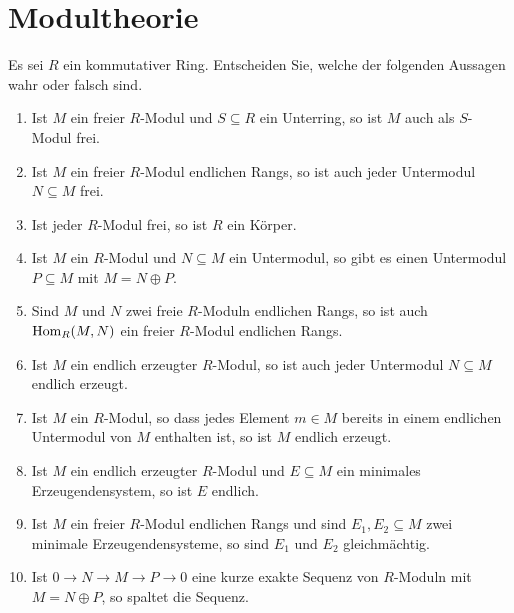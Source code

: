 \section{Modultheorie}




\begin{question}[subtitle = Multiple Choice]
  Es sei $R$ ein kommutativer Ring.
  Entscheiden Sie, welche der folgenden Aussagen wahr oder falsch sind.
  \begin{enumerate}
    \item
      Ist $M$ ein freier $R$-Modul und $S \subseteq R$ ein Unterring, so ist $M$ auch als $S$-Modul frei.
    \item
      Ist $M$ ein freier $R$-Modul endlichen Rangs, so ist auch jeder Untermodul $N \subseteq M$ frei.
    \item
      Ist jeder $R$-Modul frei, so ist $R$ ein Körper.
    \item
      Ist $M$ ein $R$-Modul und $N \subseteq M$ ein Untermodul, so gibt es einen Untermodul $P \subseteq M$ mit $M = N \oplus P$.
    \item
      Sind $M$ und $N$ zwei freie $R$-Moduln endlichen Rangs, so ist auch $\operatorname{Hom}_R(M, N)$ ein freier $R$-Modul endlichen Rangs.
    \item
      Ist $M$ ein endlich erzeugter $R$-Modul, so ist auch jeder Untermodul $N \subseteq M$ endlich erzeugt.
    \item
      Ist $M$ ein $R$-Modul, so dass jedes Element $m \in M$ bereits in einem endlichen Untermodul von $M$ enthalten ist, so ist $M$ endlich erzeugt.
    \item
      Ist $M$ ein endlich erzeugter $R$-Modul und $E \subseteq M$ ein minimales Erzeugendensystem, so ist $E$ endlich.
    \item
      Ist $M$ ein freier $R$-Modul endlichen Rangs und sind $E_1, E_2 \subseteq M$ zwei minimale Erzeugendensysteme, so sind $E_1$ und $E_2$ gleichmächtig.
    \item
      Ist $0 \to N \to M \to P \to 0$ eine kurze exakte Sequenz von $R$-Moduln mit $M = N \oplus P$, so spaltet die Sequenz.

\end{enumerate}
\end{question}
